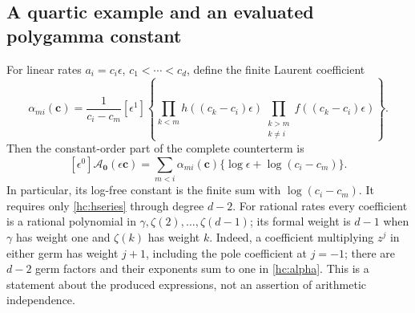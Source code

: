 \subsection{A quartic example and an evaluated polygamma constant}

For linear rates $a_i=c_i\epsilon$, $c_1<\cdots<c_d$, define the
finite Laurent coefficient
\begin{equation}\label{hc:alpha}
 \alpha_{mi}(\boldsymbol c)=\frac1{c_i-c_m}
 [\epsilon^1]\left\{
   \prod_{k<m}h((c_k-c_i)\epsilon)
   \prod_{\substack{k>m\\k\ne i}}f((c_k-c_i)\epsilon)
 \right\}.
\end{equation}
Then the constant-order part of the complete counterterm is
\begin{equation}\label{hc:linear-constant}
 [\epsilon^0]\mathcal A_{\boldsymbol0}(\epsilon\boldsymbol c)
 =\sum_{m<i}\alpha_{mi}(\boldsymbol c)
               \{\log\epsilon+\log(c_i-c_m)\}.
\end{equation}
In particular, its log-free constant is the finite sum with
$\log(c_i-c_m)$. It requires only \eqref{hc:hseries} through degree
$d-2$. For rational rates every coefficient is a rational polynomial
in $\gamma,\zeta(2),\ldots,\zeta(d-1)$; its formal weight is $d-1$
when $\gamma$ has weight one and $\zeta(k)$ has weight $k$.
Indeed, a coefficient multiplying $z^j$ in either germ has weight
$j+1$, including the pole coefficient at $j=-1$; there are $d-2$
germ factors and their exponents sum to one in \eqref{hc:alpha}.
This is a statement about the produced expressions, not an assertion
of arithmetic independence.


